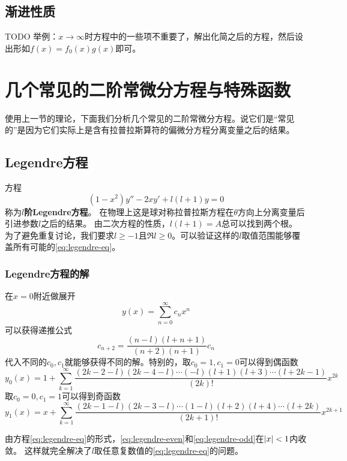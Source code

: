\documentclass[UTF8]{ctexart}
\newcommand*{\taylor}[1]{\sum_{#1 = 0}^\infty}
\newcommand*{\taylorfrom}[2]{\sum_{#1=#2}^\infty}
\begin{document}
\subsection{渐进性质}

TODO
举例：$x \to \infty$时方程中的一些项不重要了，解出化简之后的方程，然后设出形如$f(x) = f_0(x)g(x)$即可。

\section{几个常见的二阶常微分方程与特殊函数}

使用上一节的理论，下面我们分析几个常见的二阶常微分方程。说它们是“常见的”是因为它们实际上是含有拉普拉斯算符的偏微分方程分离变量之后的结果。

\subsection{Legendre方程}
方程
\begin{equation}
    (1-x^2)y'' - 2 x y' + l(l+1) y = 0
    \label{eq:legendre-eq}
\end{equation}
称为\textbf{$l$阶Legendre方程}。
在物理上这是球对称拉普拉斯方程在$\theta$方向上分离变量后引进参数$l$之后的结果。
由二次方程的性质，$l(l+1)=A$总可以找到两个根。
为了避免重复讨论，我们要求$l \geq -1$且$\Re l \geq 0$。可以验证这样的$l$取值范围能够覆盖所有可能的\eqref{eq:legendre-eq}。

\subsubsection{Legendre方程的解}
在$x=0$附近做展开
\[
    y(x) = \taylor{n} c_n x^n
\]
可以获得递推公式
\begin{equation}
    c_{n+2} = \frac{(n-l)(l+n+1)}{(n+2)(n+1)} c_n
\end{equation}
代入不同的$c_0, c_1$就能够获得不同的解。特别的，取$c_0=1, c_1=0$可以得到偶函数
\begin{equation}
    y_0(x) = 1 + \taylorfrom{k}{1} \frac{(2k-2-l)(2k-4-l)\cdots(-l)(l+1)(l+3)\cdots(l+2k-1)}{(2k)!} x^{2k}
    \label{eq:legendre-even}
\end{equation}
取$c_0=0, c_1=1$可以得到奇函数
\begin{equation}
    y_1(x) = x + \taylorfrom{k}{1} \frac{(2k-1-l)(2k-3-l)\cdots(1-l)(l+2)(l+4)\cdots(l+2k)}{(2k+1)!} x^{2k+1}
    \label{eq:legendre-odd}
\end{equation}

由方程\eqref{eq:legendre-eq}的形式，\eqref{eq:legendre-even}和\eqref{eq:legendre-odd}在$\abs{x}<1$内收敛。
这样就完全解决了$l$取任意复数值的\eqref{eq:legendre-eq}的问题。
\end{document}
